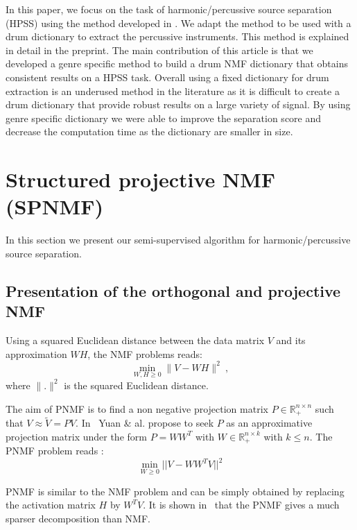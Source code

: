 \documentclass{article}
\begin{document}
In this paper, we focus on the task of harmonic/percussive source separation (HPSS) using the method developed in \cite{laroche2015structured}. We adapt the method to be used with a drum dictionary to extract the percussive instruments. This method is explained in detail in the preprint. 
The main contribution of this article is that we developed a genre specific method to build a drum NMF dictionary that obtains consistent results on a HPSS task. Overall using a fixed dictionary for drum extraction is an underused method in the literature as it is difficult to create a drum dictionary that provide robust results on a large variety of signal. By using genre specific dictionary we were able to improve the separation score and decrease the computation time as the dictionary are smaller in size. 
 


\section{Structured projective NMF (SPNMF)}
\label{sec:SPNMF}

In this section we present our semi-supervised algorithm for harmonic/percussive source separation.

\subsection{Presentation of the orthogonal and projective NMF}\label{subsec:PNMF}


Using a squared Euclidean distance between the data matrix $V$ and its approximation $WH$, the NMF problems reads:
$$
\min_{W,H\geq 0} \|V - WH\|^2\ , 
$$
where $\|.\|^{2}$ is the squared Euclidean distance.

The aim of PNMF is to find a non negative projection matrix $P \in \mathbb{R}_{+}^{n \times n}$ such that $V \approx \tilde{V} = PV$. In~\cite{yuanOja2005} Yuan \& al. propose to seek $P$ as an approximative projection matrix under the form $P = WW^{T}$ with $W \in \mathbb{R}_{+}^{n \times k}$ with $ k \leqslant n $. The PNMF problem reads : 
\begin{equation}\label{EqPnmf}
\min_{W \geqslant 0} ||V - WW^{T}V||^2 
\end{equation}

PNMF is similar to the NMF problem and can be simply obtained by replacing the activation matrix $H$ by $W^TV$. It is shown in~\cite{YangOja10} that the PNMF gives a much sparser decomposition than NMF.
\end{document}
